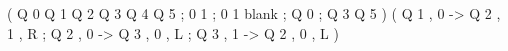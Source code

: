 ( Q 0 Q 1 Q 2 Q 3 Q 4 Q 5 ; 0 1 ; 0 1 blank ; Q 0 ; Q 3 Q 5 )
( Q 1 , 0 -> Q 2 , 1 , R
; Q 2 , 0 -> Q 3 , 0 , L
; Q 3 , 1 -> Q 2 , 0 , L )

